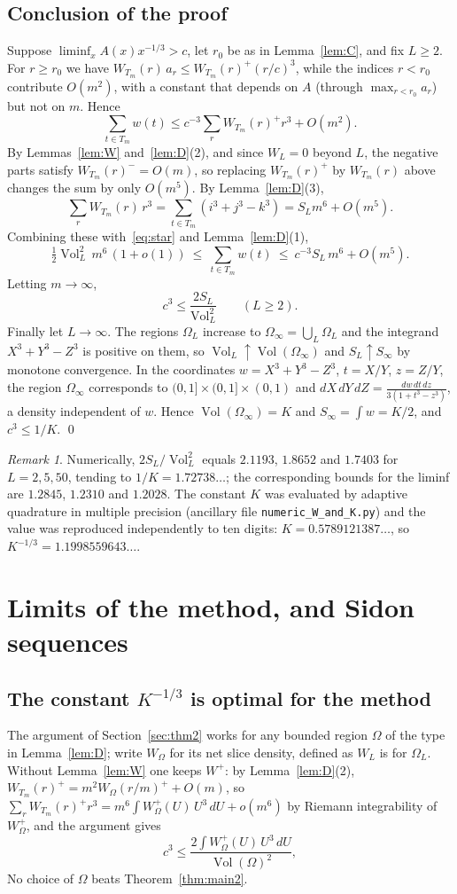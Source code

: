 \documentclass[11pt]{amsart}
\theoremstyle{remark}
\newtheorem{remark}{Remark}
\newcommand{\Vol}{\operatorname{Vol}}
\begin{document}
\subsection{Conclusion of the proof}
Suppose $\liminf_x A(x)x^{-1/3}>c$, let $r_0$ be as in Lemma~\ref{lem:C}, and fix $L\ge2$. For $r\ge r_0$ we have $W_{T_m}(r)\,a_r\le W_{T_m}(r)^+(r/c)^3$, while the indices $r<r_0$ contribute $O(m^2)$, with a constant that depends on $A$ (through $\max_{r<r_0}a_r$) but not on $m$. Hence
\[
\sum_{t\in T_m}w(t)\le c^{-3}\sum_r W_{T_m}(r)^+r^3+O(m^2).
\]
By Lemmas~\ref{lem:W} and~\ref{lem:D}(2), and since $W_L=0$ beyond $L$, the negative parts satisfy $W_{T_m}(r)^-=O(m)$, so replacing $W_{T_m}(r)^+$ by $W_{T_m}(r)$ above changes the sum by only $O(m^5)$. By Lemma~\ref{lem:D}(3),
\[
\sum_rW_{T_m}(r)\,r^3=\sum_{t\in T_m}(i^3+j^3-k^3)=S_Lm^6+O(m^5).
\]
Combining these with~\eqref{eq:star} and Lemma~\ref{lem:D}(1),
\[
\tfrac12\Vol_L^2\,m^6\,(1+o(1))\ \le\ \sum_{t\in T_m}w(t)\ \le\ c^{-3}S_L\,m^6+O(m^5).
\]
Letting $m\to\infty$,
\[
c^3\le\frac{2S_L}{\Vol_L^2}\qquad(L\ge2).
\]
Finally let $L\to\infty$. The regions $\Omega_L$ increase to $\Omega_\infty=\bigcup_L\Omega_L$ and the integrand $X^3+Y^3-Z^3$ is positive on them, so $\Vol_L\uparrow\Vol(\Omega_\infty)$ and $S_L\uparrow S_\infty$ by monotone convergence. In the coordinates $w=X^3+Y^3-Z^3$, $t=X/Y$, $z=Z/Y$, the region $\Omega_\infty$ corresponds to $(0,1]\times(0,1]\times(0,1)$ and $dX\,dY\,dZ=\frac{dw\,dt\,dz}{3(1+t^3-z^3)}$, a density independent of $w$. Hence $\Vol(\Omega_\infty)=K$ and $S_\infty=\int w=K/2$, and $c^3\le1/K$. \qed

\begin{remark}
Numerically, $2S_L/\Vol_L^2$ equals $2.1193$, $1.8652$ and $1.7403$ for $L=2,5,50$, tending to $1/K=1.72738\ldots$; the corresponding bounds for the liminf are $1.2845$, $1.2310$ and $1.2028$. The constant $K$ was evaluated by adaptive quadrature in multiple precision (ancillary file \texttt{numeric\_W\_and\_K.py}) and the value was reproduced independently to ten digits: $K=0.5789121387\ldots$, so $K^{-1/3}=1.1998559643\ldots$.
\end{remark}

\section{Limits of the method, and Sidon sequences}\label{sec:limits}

\subsection{The constant \texorpdfstring{$K^{-1/3}$}{K\textasciicircum(-1/3)} is optimal for the method}
The argument of Section~\ref{sec:thm2} works for any bounded region $\Omega$ of the type in Lemma~\ref{lem:D}; write $W_\Omega$ for its net slice density, defined as $W_L$ is for $\Omega_L$. Without Lemma~\ref{lem:W} one keeps $W^+$: by Lemma~\ref{lem:D}(2), $W_{T_m}(r)^+=m^2W_\Omega(r/m)^++O(m)$, so $\sum_rW_{T_m}(r)^+r^3=m^6\int W_\Omega^+(U)\,U^3\,dU+o(m^6)$ by Riemann integrability of $W_\Omega^+$, and the argument gives
\[
c^3\le\frac{2\int W_\Omega^+(U)\,U^3\,dU}{\Vol(\Omega)^2},
\]
No choice of $\Omega$ beats Theorem~\ref{thm:main2}.
\end{document}
